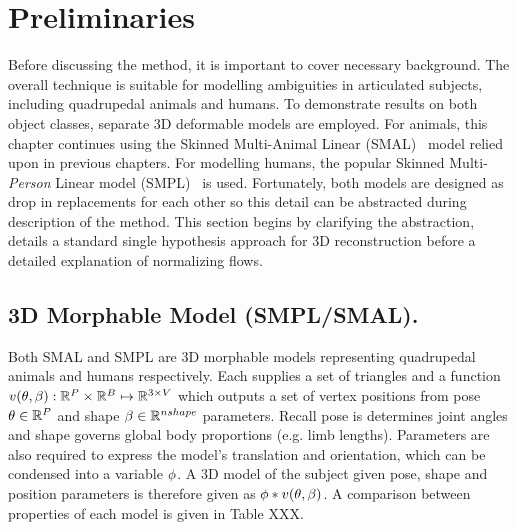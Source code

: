 \section{Preliminaries}\label{s:preliminaries}

Before discussing the method, it is important to cover necessary background. The overall technique is suitable for modelling ambiguities in articulated subjects, including quadrupedal animals and humans. To demonstrate results on both object classes, separate 3D deformable models are employed. For animals, this chapter continues using the Skinned Multi-Animal Linear (SMAL)~\cite{xxx} model relied upon in previous chapters. For modelling humans, the popular Skinned Multi-\emph{Person} Linear model (SMPL)~\cite{xxx} is used. Fortunately, both models are designed as drop in replacements for each other so this detail can be abstracted during description of the method. This section begins by clarifying the abstraction, details a standard single hypothesis approach for 3D reconstruction before a detailed explanation of normalizing flows.

\subsection{3D Morphable Model (SMPL/SMAL).}

Both SMAL and SMPL are 3D morphable models representing quadrupedal animals and humans respectively. Each supplies a set of triangles and a function $v(\theta,\beta): {\mathbb{R}^{P}} \times {\mathbb{R}^{B}} \mapsto {\mathbb{R}^{3 \times V}}$ which outputs a set of vertex positions from pose $\theta \in {\mathbb{R}^{P}}$ and shape $\beta \in {\mathbb{R}^{nshape}}$ parameters. Recall pose is determines joint angles and shape governs global body proportions (e.g. limb lengths). Parameters are also required to express the model's translation and orientation, which can be condensed into a variable $\phi$. A 3D model of the subject given pose, shape and position parameters is therefore given as $\phi * v(\theta,\beta)$. A comparison between properties of each model is given in Table XXX. 

    

